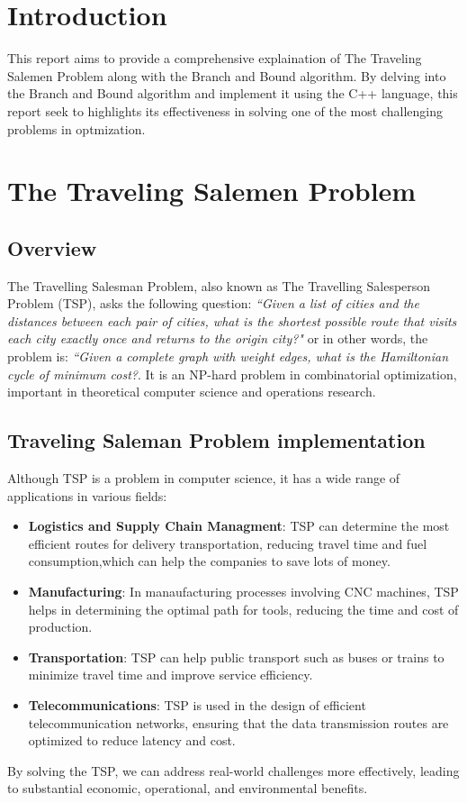 \documentclass[a4paper]{article}
\begin{document}
\setcounter{page}{0}
\thispagestyle{empty}
\newpage
\tableofcontents
\newpage

\section{Introduction}
This report aims to provide a comprehensive explaination of The Traveling Salemen Problem along with the Branch and Bound algorithm. By delving into the Branch and Bound algorithm and implement it using the C++ language, this report seek to highlights its effectiveness in solving one of the most challenging problems in optmization. 
\section{The Traveling Salemen Problem}
\subsection{Overview}
The Travelling Salesman Problem, also known as The Travelling Salesperson Problem (TSP), asks the following question: \textit{``Given a list of cities and the distances between each pair of cities, what is the shortest possible route that visits each city exactly once and returns to the origin city?"} or in other words, the problem is: \textit{``Given a complete graph with weight edges, what is the Hamiltonian cycle of minimum cost?}. It is an NP-hard problem in combinatorial optimization, important in theoretical computer science and operations research.
\subsection{Traveling Saleman Problem implementation}
Although TSP is a problem in computer science, it has a wide range of applications in various fields:
\begin{itemize}
    \item \textbf{Logistics and Supply Chain Managment}: TSP can determine the most efficient routes for delivery transportation, reducing travel time and fuel consumption,which can help the companies to save lots of money.
    \item \textbf{Manufacturing}: In manaufacturing processes involving CNC machines, TSP helps in determining the optimal path for tools, reducing the time and cost of production.
    \item \textbf{Transportation}: TSP can help public transport such as buses or trains to minimize travel time and improve service efficiency.
    \item \textbf{Telecommunications}: TSP is used in the design of efficient telecommunication networks, ensuring that the data transmission routes are optimized to reduce latency and cost.
\end{itemize}
By solving the TSP, we can address real-world challenges more effectively, leading to substantial economic, operational, and environmental benefits.
\end{document}
